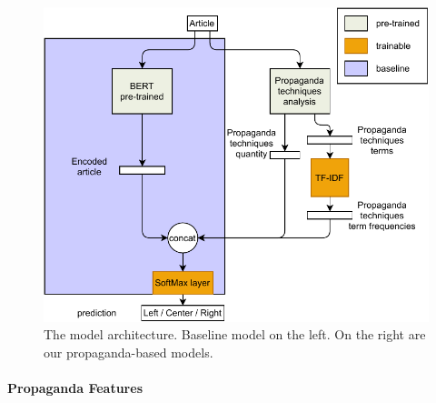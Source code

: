 
\begin{figure}[!htb]
    \centering
    \includegraphics[width=\linewidth]{figures/methodology-Page-1.pdf}
    \caption{The model architecture. Baseline model on the left. On the right are our propaganda-based models.}
    \label{fig:model_classifier}
\end{figure}


\paragraph{Propaganda Features}


